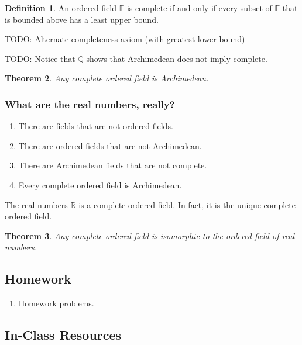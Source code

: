 \documentclass[11pt]{article}
\newtheorem{theorem}{Theorem}[section]
\theoremstyle{definition}
\newtheorem{definition}[theorem]{Definition}
\begin{document}
\begin{definition}
  An ordered field $\mathbb{F}$ is complete if and only if every subset of $\mathbb{F}$ that is bounded above has a least upper bound.
\end{definition}

TODO: Alternate completeness axiom (with greatest lower bound)

TODO: Notice that $\mathbb{Q}$ shows that Archimedean does not imply complete.

\begin{theorem}
  Any complete ordered field is Archimedean.
  \label{theorem: complete implies archimedean}
\end{theorem}

\subsubsection{What are the real numbers, really?}

\begin{enumerate}
  \item There are fields that are not ordered fields.
  \item There are ordered fields that are not Archimedean.
  \item There are Archimedean fields that are not complete.
  \item Every complete ordered field is Archimedean.
\end{enumerate}

The real numbers $\mathbb{R}$ is a complete ordered field. In fact, it is the unique complete ordered field.

\begin{theorem}
  Any complete ordered field is isomorphic to the ordered field of real numbers.
  \label{theorem: reals are unique}
\end{theorem}

\newpage \subsection{Homework}  

\begin{enumerate}

  \item Homework problems.


\end{enumerate}

\subsection{In-Class Resources}
\end{document}

